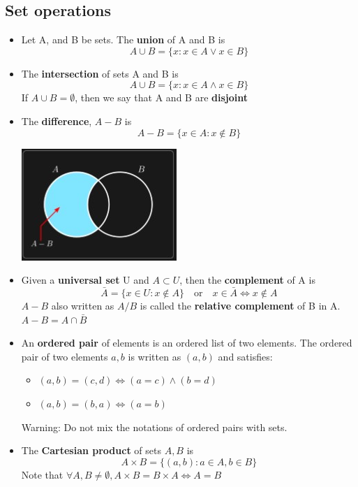 \documentclass[letterpaper,12pt]{article}
\begin{document}
\subsection{Set operations}
\begin{itemize}
    \item Let A, and B be sets. The \textbf{union} of A and B is 
    \[A\cup B = \{x:x\in A \lor x \in B\} \]
    \item The \textbf{intersection} of sets A and B is
    \[A\cup B = \{x:x\in A \land x \in B\} \]
    If $A\cup B = \emptyset$, then we say that A and B are \textbf{disjoint}
    \item The \textbf{difference}, $A - B$ is 
    \[A-B=\{x\in A : x\not \in B\} \]

    \includegraphics*{./Image/Set difference.jpg}

    \item Given a \textbf{universal set} U and $A \subset U$, then the \textbf{complement} of A is 
    \[\bar{A}=\{x\in U : x \not \in A\}  \quad \text{or} \quad x\in \bar{A} \iff x\not \in A   \]
    $A-B$ also written as $A \slash  B$ is called the \textbf{relative complement} of B in A. $A-B=A\cap \bar{B}$

    \item An \textbf{ordered pair} of elements is an ordered list of two elements. The ordered pair of two elements $a,b$ is written as $(a,b)$ and satisfies:
    \begin{itemize}
        \item $(a,b)=(c,d) \iff (a=c)\land (b=d)$
        \item $(a,b)=(b,a) \iff (a=b)$
    \end{itemize}
    Warning: Do not mix the notations of ordered pairs with sets.
    
    \item The \textbf{Cartesian product} of sets $A,B$ is 
    \[A \times B = \{(a,b): a\in A, b\in B\}\]
    Note that $\forall A,B \neq \emptyset, A \times B = B \times A \iff A = B$ 

\end{itemize}
\end{document}
